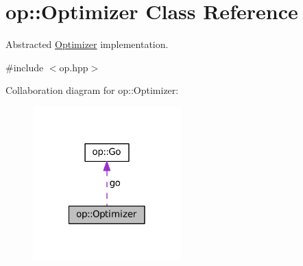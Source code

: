 \hypertarget{classop_1_1Optimizer}{\section{op\-:\-:Optimizer Class Reference}
\label{classop_1_1Optimizer}
}


Abstracted \hyperlink{classop_1_1Optimizer}{Optimizer} implementation.  




{\ttfamily \#include $<$op.\-hpp$>$}



Collaboration diagram for op\-:\-:Optimizer\-:
\nopagebreak
\begin{figure}[H]
\begin{center}
\leavevmode
\includegraphics[width=162pt]{classop_1_1Optimizer__coll__graph}
\end{center}
\end{figure}
